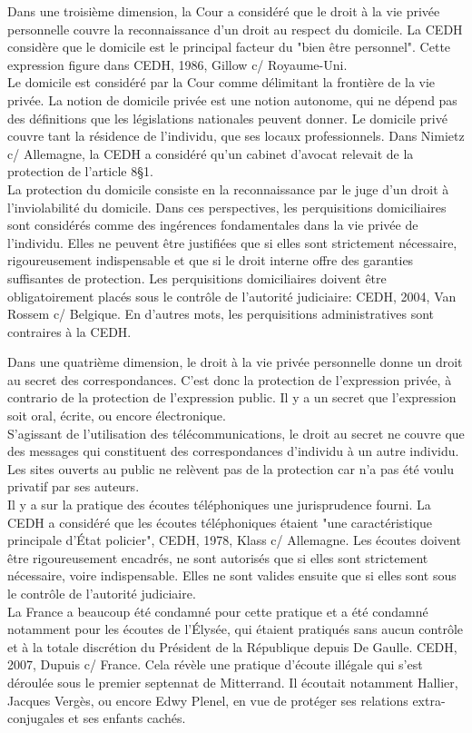 \documentclass[10pt, a4paper, openany]{book}
\begin{document}
Dans une troisième dimension, la Cour a considéré que le droit à la vie privée personnelle couvre la reconnaissance d'un droit au respect du domicile. La CEDH considère que le domicile est le principal facteur du "bien être personnel". Cette expression figure dans CEDH, 1986, Gillow c/ Royaume-Uni. \\
Le domicile est considéré par la Cour comme délimitant la frontière de la vie privée. La notion de domicile privée est une notion autonome, qui ne dépend pas des définitions que les législations nationales peuvent donner. Le domicile privé couvre tant la résidence de l'individu, que ses locaux professionnels. Dans Nimietz c/ Allemagne, la CEDH a considéré qu'un cabinet d'avocat relevait de la protection de l'article 8§1. \\
La protection du domicile consiste en la reconnaissance par le juge d'un droit à l'inviolabilité du domicile. Dans ces perspectives, les perquisitions domiciliaires sont considérés comme des ingérences fondamentales dans la vie privée de l'individu. Elles ne peuvent être justifiées que si elles sont strictement nécessaire, rigoureusement indispensable et que si le droit interne offre des garanties suffisantes de protection. Les perquisitions domiciliaires doivent être obligatoirement placés sous le contrôle de l'autorité judiciaire: CEDH, 2004, Van Rossem c/ Belgique. En d'autres mots, les perquisitions administratives sont contraires à la CEDH. 


Dans une quatrième dimension, le droit à la vie privée personnelle donne un droit au secret des correspondances. C'est donc la protection de l'expression privée, à contrario de la protection de l'expression public. Il y a un secret que l'expression soit oral, écrite, ou encore électronique. \\
S'agissant de l'utilisation des télécommunications, le droit au secret ne couvre que des messages qui constituent des correspondances d'individu à un autre individu. Les sites ouverts au public ne relèvent pas de la protection car n'a pas été voulu privatif par ses auteurs. \\
Il y a sur la pratique des écoutes téléphoniques une jurisprudence fourni. La CEDH a considéré que les écoutes téléphoniques étaient "une caractéristique principale d'État policier", CEDH, 1978, Klass c/ Allemagne. Les écoutes doivent être rigoureusement encadrés, ne sont autorisés que si elles sont strictement nécessaire, voire indispensable. Elles ne sont valides ensuite que si elles sont sous le contrôle de l'autorité judiciaire. \\
La France a beaucoup été condamné pour cette pratique et a été condamné notamment pour les écoutes de l'Élysée, qui étaient pratiqués sans aucun contrôle et à la totale discrétion du Président de la République depuis De Gaulle. CEDH, 2007, Dupuis c/ France. Cela révèle une pratique d'écoute illégale qui s'est déroulée sous le premier septennat de Mitterrand. Il écoutait notamment Hallier, Jacques Vergès, ou encore Edwy Plenel, en vue de protéger ses relations extra-conjugales et ses enfants cachés.
\end{document}
